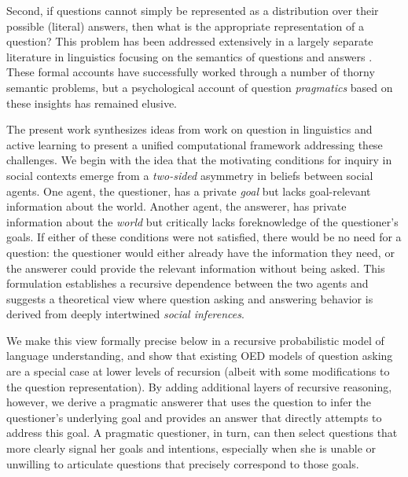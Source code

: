 \documentclass[12pt, floatsintext, jou]{apa6}
\begin{document}
Second, if questions cannot simply be represented as a distribution over their possible (literal) answers, then what is the appropriate representation of a question?
This problem has been addressed extensively in a largely separate literature in linguistics focusing on the semantics of questions and answers \cite{GroenendijkStokhof84_SemanticsOfQuestions,Ginzburg95_ResolvingQuestions,VanRooy03_QuestioningDecisionProblems,ciardelli2013inquisitive}. 
These formal accounts have successfully worked through a number of thorny semantic problems, but a psychological account of question \emph{pragmatics} based on these insights has remained elusive.

The present work synthesizes ideas from work on question in linguistics and active learning to present a unified computational framework addressing these challenges.
We begin with the idea that the motivating conditions for inquiry in social contexts emerge from a \emph{two-sided} asymmetry in beliefs between social agents. 
One agent, the questioner, has a private \emph{goal} but lacks goal-relevant information about the world.
Another agent, the answerer, has private information about the \emph{world} but critically lacks foreknowledge of the questioner's goals.
If either of these conditions were not satisfied, there would be no need for a question: the questioner would either already have the information they need, or the answerer could provide the relevant information without being asked.
This formulation establishes a recursive dependence between the two agents and suggests a theoretical view where question asking and answering behavior is derived from deeply intertwined \emph{social inferences}.

We make this view formally precise below in a recursive probabilistic model of language understanding, and show that existing OED models of question asking are a special case at lower levels of recursion (albeit with some modifications to the question representation).
By adding additional layers of recursive reasoning, however, we derive a pragmatic answerer that uses the question to infer the questioner's underlying goal and provides an answer that directly attempts to address this goal. 
A pragmatic questioner, in turn, can then select questions that more clearly signal her goals and intentions, especially when she is unable or unwilling to articulate questions that precisely correspond to those goals. 
\end{document}
